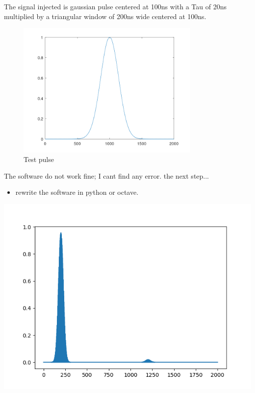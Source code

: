 \documentclass[12pt, letterpaper]{article}
\begin{document}
The signal injected is  gaussian pulse centered at 100ns with a Tau of 20ns multiplied by a triangular window of 200ns wide centered at 100ns.\\

\begin{figure}[h]
	\centering
	\includegraphics[width=0.8\textwidth]{gaussian_pulse.png} %
	\caption{Test pulse}
	\label{fig:example}
\end{figure}

The software do not work fine; I cant find any error. the next step...
\begin{itemize}
	\item rewrite the software in python or octave.
\end{itemize}

\includegraphics{python-with-zero.png}
\end{document}
